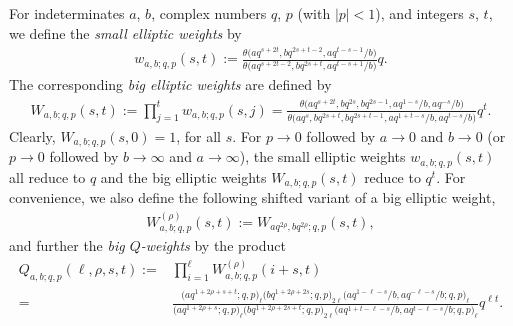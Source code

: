\documentclass[10pt,a4paper]{amsart}
\numberwithin{equation}{section}
\theoremstyle{definition}
\newcommand{\ta}{\theta}
\begin{document}
For indeterminates $a$, $b$, complex numbers $q$, $p$ (with $|p|<1$),
and integers $s$, $t$, we define the \textit{small elliptic weights} by
\begin{gather}\label{wdef}
w_{a,b;q,p}(s,t):=
\frac{\ta\bigl(aq^{s+2t},bq^{2s+t-2},aq^{t-s-1}/b\bigr)}
{\ta\bigl(aq^{s+2t-2},bq^{2s+t},aq^{t-s+1}/b\bigr)}q.
\end{gather}
The corresponding \textit{big elliptic weights} are defined by
\begin{gather}\label{Wdef}
W_{a,b;q,p}(s,t):=\prod_{j=1}^tw_{a,b;q,p}(s,j)
=\frac{\ta\bigl(aq^{s+2t},bq^{2s},bq^{2s-1},aq^{1-s}/b,aq^{-s}/b\bigr)}
{\ta\bigl(aq^s,bq^{2s+t},bq^{2s+t-1},aq^{1+t-s}/b,aq^{t-s}/b\bigr)}q^t.
\end{gather}
Clearly, $W_{a,b;q,p}(s,0)=1$, for all $s$.
For $p\to 0$ followed by $a\to 0$ and $b\to 0$
(or $p\to 0$ followed by $b\to \infty$ and $a\to \infty$),
the small elliptic weights $w_{a,b;q,p}(s,t)$ all reduce to $q$
and the big elliptic weights $W_{a,b;q,p}(s,t)$ reduce to $q^t$.
For convenience, we also define the following shifted variant of
a big elliptic weight,
\begin{gather}\label{sWdef}
W_{a,b;q,p}^{(\rho)}(s,t):=W_{aq^{2\rho},bq^{2\rho};q,p}(s,t),
\end{gather}
and further the \textit{big $Q$-weights} by the product
\begin{align}
Q_{a,b;q,p}(\ell,\rho,s,t):={}& \prod_{i=1}^\ell
W_{a,b;q,p}^{(\rho)}(i+s,t)\label{Qweights}\\
={}&\frac{\bigl(aq^{1+2\rho+s+t};q,p\bigr)_\ell \bigl(bq^{1+2\rho+2s};q,p\bigr)_{2\ell}
\bigl(aq^{1-\ell-s}/b,aq^{-\ell-s}/b;q,p\bigr)_\ell}
{\bigl(aq^{1+2\rho+s};q,p\bigr)_\ell \bigl(bq^{1+2\rho+2s+t};q,p\bigr)_{2\ell}
\bigl(aq^{1+t-\ell-s}/b,aq^{t-\ell-s}/b;q,p)_\ell}q^{\ell t}.\nonumber
\end{align}
\end{document}
